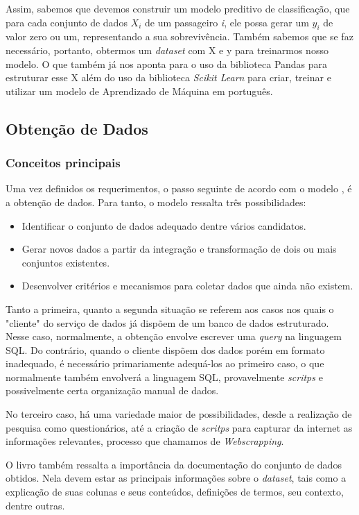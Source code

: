 \documentclass{article}
\begin{document}
Assim, sabemos que devemos construir um modelo preditivo de classificação, que para cada conjunto de dados $X_i$ de um passageiro \emph{i}, ele possa gerar um $y_i$ de valor zero ou um, representando a sua sobrevivência. Também sabemos que se faz necessário, portanto, obtermos um \emph{dataset} com X e y para treinarmos nosso modelo. O que também já nos aponta para o uso da biblioteca Pandas para estruturar esse X além do uso da biblioteca \emph{Scikit Learn} para criar, treinar e utilizar um modelo de Aprendizado de Máquina em português.

\subsection{Obtenção de Dados}
\subsubsection{Conceitos principais}
Uma vez definidos os requerimentos, o passo seguinte de acordo com o modelo \cite{BATON}, é a obtenção de dados. Para tanto, o modelo ressalta três possibilidades:
\begin{itemize}
\item Identificar o conjunto de dados adequado dentre vários candidatos. 
\item Gerar novos dados a partir da integração e transformação de dois ou mais conjuntos existentes. 
\item Desenvolver critérios e mecanismos para coletar dados que ainda não existem. 
\end{itemize}
 
Tanto a primeira, quanto a segunda situação se referem aos casos nos quais o "cliente" do serviço de dados já dispõem de um banco de dados estruturado. Nesse caso, normalmente, a obtenção envolve escrever uma \emph{query} na linguagem SQL.  
 Do contrário, quando o cliente dispõem dos dados porém em formato inadequado,  é necessário primariamente adequá-los ao primeiro caso, o que normalmente também envolverá a linguagem SQL, provavelmente \emph{scritps} e possivelmente certa organização manual de dados.  

 No terceiro caso, há uma variedade maior de possibilidades, desde a realização de pesquisa como questionários, até a criação de \emph{scritps} para capturar da internet as informações relevantes, processo que chamamos de \emph{Webscrapping}\cite{mitchell2018web}. 
  
O livro \cite{DATAPYTHON} também ressalta a importância da documentação do conjunto de dados obtidos. Nela devem estar as principais informações sobre o \emph{dataset}, tais como a explicação de suas colunas e seus conteúdos, definições de termos, seu contexto, dentre outras. 
\end{document}
